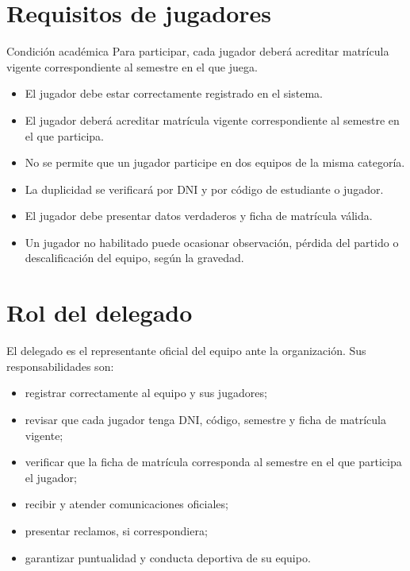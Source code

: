 \documentclass[12pt,a4paper]{article}
\begin{document}
	\section{Requisitos de jugadores}
	
	\begin{cajaImportante}{Condición académica}
		Para participar, cada jugador deberá acreditar matrícula vigente correspondiente al semestre en el que juega.
	\end{cajaImportante}
	
	\begin{itemize}
		\item El jugador debe estar correctamente registrado en el sistema.
		\item El jugador deberá acreditar matrícula vigente correspondiente al semestre en el que participa.
		\item No se permite que un jugador participe en dos equipos de la misma categoría.
		\item La duplicidad se verificará por DNI y por código de estudiante o jugador.
		\item El jugador debe presentar datos verdaderos y ficha de matrícula válida.
		\item Un jugador no habilitado puede ocasionar observación, pérdida del partido o descalificación del equipo, según la gravedad.
	\end{itemize}
	
	\section{Rol del delegado}
	
	El delegado es el representante oficial del equipo ante la organización. Sus responsabilidades son:
	
	\begin{itemize}
		\item registrar correctamente al equipo y sus jugadores;
		\item revisar que cada jugador tenga DNI, código, semestre y ficha de matrícula vigente;
		\item verificar que la ficha de matrícula corresponda al semestre en el que participa el jugador;
		\item recibir y atender comunicaciones oficiales;
		\item presentar reclamos, si correspondiera;
		\item garantizar puntualidad y conducta deportiva de su equipo.
	\end{itemize}
	
\end{document}
